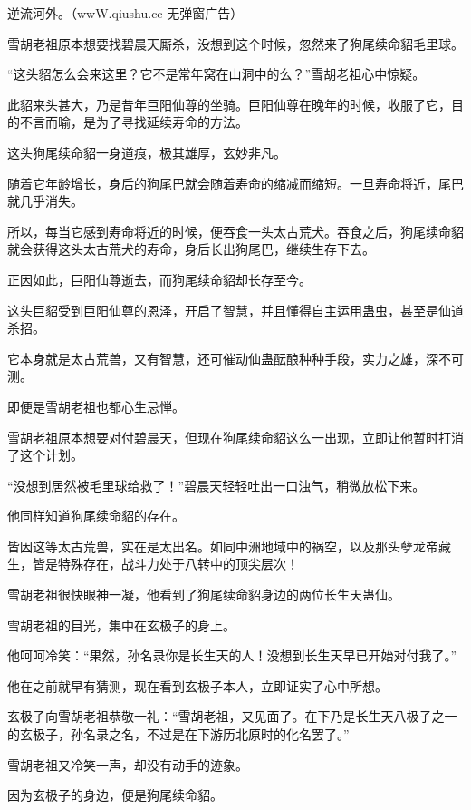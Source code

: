 
\begin{this_body}

逆流河外。（wwW.qiushu.cc 无弹窗广告）

雪胡老祖原本想要找碧晨天厮杀，没想到这个时候，忽然来了狗尾续命貂毛里球。

“这头貂怎么会来这里？它不是常年窝在山洞中的么？”雪胡老祖心中惊疑。

此貂来头甚大，乃是昔年巨阳仙尊的坐骑。巨阳仙尊在晚年的时候，收服了它，目的不言而喻，是为了寻找延续寿命的方法。

这头狗尾续命貂一身道痕，极其雄厚，玄妙非凡。

随着它年龄增长，身后的狗尾巴就会随着寿命的缩减而缩短。一旦寿命将近，尾巴就几乎消失。

所以，每当它感到寿命将近的时候，便吞食一头太古荒犬。吞食之后，狗尾续命貂就会获得这头太古荒犬的寿命，身后长出狗尾巴，继续生存下去。

正因如此，巨阳仙尊逝去，而狗尾续命貂却长存至今。

这头巨貂受到巨阳仙尊的恩泽，开启了智慧，并且懂得自主运用蛊虫，甚至是仙道杀招。

它本身就是太古荒兽，又有智慧，还可催动仙蛊酝酿种种手段，实力之雄，深不可测。

即便是雪胡老祖也都心生忌惮。

雪胡老祖原本想要对付碧晨天，但现在狗尾续命貂这么一出现，立即让他暂时打消了这个计划。

“没想到居然被毛里球给救了！”碧晨天轻轻吐出一口浊气，稍微放松下来。

他同样知道狗尾续命貂的存在。

皆因这等太古荒兽，实在是太出名。如同中洲地域中的祸空，以及那头孽龙帝藏生，皆是特殊存在，战斗力处于八转中的顶尖层次！

雪胡老祖很快眼神一凝，他看到了狗尾续命貂身边的两位长生天蛊仙。

雪胡老祖的目光，集中在玄极子的身上。

他呵呵冷笑：“果然，孙名录你是长生天的人！没想到长生天早已开始对付我了。”

他在之前就早有猜测，现在看到玄极子本人，立即证实了心中所想。

玄极子向雪胡老祖恭敬一礼：“雪胡老祖，又见面了。在下乃是长生天八极子之一的玄极子，孙名录之名，不过是在下游历北原时的化名罢了。”

雪胡老祖又冷笑一声，却没有动手的迹象。

因为玄极子的身边，便是狗尾续命貂。


\end{this_body}
